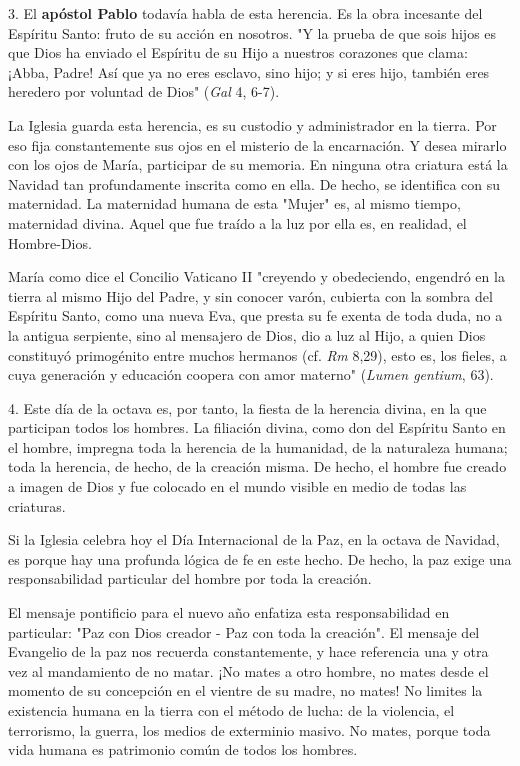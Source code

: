 \begin{body}
3. El \textbf{apóstol Pablo} todavía habla de esta herencia. Es la obra
incesante del Espíritu Santo: fruto de su acción en nosotros. "Y la
prueba de que sois hijos es que Dios ha enviado el Espíritu de su Hijo a
nuestros corazones que clama: ¡Abba, Padre! Así que ya no eres esclavo,
sino hijo; y si eres hijo, también eres heredero por voluntad de Dios"
(\emph{Gal} 4, 6-7).

La Iglesia guarda esta herencia, es su custodio y administrador en la
tierra. Por eso fija constantemente sus ojos en el misterio de la
encarnación. Y desea mirarlo con los ojos de María, participar de su
memoria. En ninguna otra criatura está la Navidad tan profundamente
inscrita como en ella. De hecho, se identifica con su maternidad. La
maternidad humana de esta "Mujer" es, al mismo tiempo, maternidad
divina. Aquel que fue traído a la luz por ella es, en realidad, el
Hombre-Dios.

María como dice el Concilio Vaticano II "creyendo y obedeciendo,
engendró en la tierra al mismo Hijo del Padre, y sin conocer varón,
cubierta con la sombra del Espíritu Santo, como una nueva Eva, que
presta su fe exenta de toda duda, no a la antigua serpiente, sino al
mensajero de Dios, dio a luz al Hijo, a quien Dios constituyó
primogénito entre muchos hermanos (cf. \emph{Rm} 8,29), esto es, los
fieles, a cuya generación y educación coopera con amor materno"
(\emph{Lumen gentium}, 63).

4. Este día de la octava es, por tanto, la fiesta de la herencia divina,
en la que participan todos los hombres. La filiación divina, como don
del Espíritu Santo en el hombre, impregna toda la herencia de la
humanidad, de la naturaleza humana; toda la herencia, de hecho, de la
creación misma. De hecho, el hombre fue creado a imagen de Dios y fue
colocado en el mundo visible en medio de todas las criaturas.

Si la Iglesia celebra hoy el Día Internacional de la Paz, en la octava
de Navidad, es porque hay una profunda lógica de fe en este hecho. De
hecho, la paz exige una responsabilidad particular del hombre por toda
la creación.

El mensaje pontificio para el nuevo año enfatiza esta responsabilidad en
particular: "Paz con Dios creador - Paz con toda la creación". El
mensaje del Evangelio de la paz nos recuerda constantemente, y hace
referencia una y otra vez al mandamiento de no matar. ¡No mates a otro
hombre, no mates desde el momento de su concepción en el vientre de su
madre, no mates! No limites la existencia humana en la tierra con el
método de lucha: de la violencia, el terrorismo, la guerra, los medios
de exterminio masivo. No mates, porque toda vida humana es patrimonio
común de todos los hombres.


\end{body}
